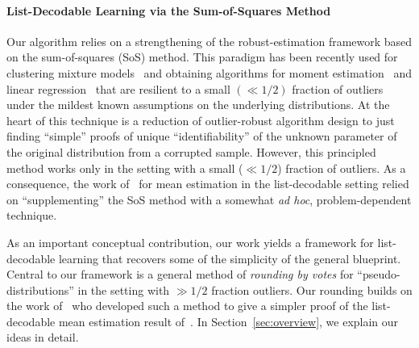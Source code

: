 


\paragraph{List-Decodable Learning via the Sum-of-Squares Method} Our algorithm relies on a strengthening of the robust-estimation framework based on the sum-of-squares (SoS) method. This paradigm has been recently used for clustering mixture models~\cite{HopkinsLi17,KothariSteinhardt17} and obtaining algorithms for moment estimation~\cite{2017KS} and linear regression~\cite{DBLP:conf/colt/KlivansKM18} that are resilient to a small $(\ll 1/2)$ fraction of outliers under the mildest known assumptions on the underlying distributions. At the heart of this technique is a reduction of outlier-robust algorithm design to just finding ``simple'' proofs of  unique ``identifiability'' of the unknown parameter of the original distribution from a corrupted sample. However, this principled method works only in the setting with a small ($\ll 1/2$) fraction of outliers. As a consequence, the work of~\cite{KothariSteinhardt17} for mean estimation in the list-decodable setting relied on ``supplementing'' the SoS method with a somewhat \emph{ad hoc}, problem-dependent technique. 

As an important conceptual contribution, our work yields a framework for list-decodable learning that recovers some of the simplicity of the general blueprint. Central to our framework is a general method of \emph{rounding by votes} for ``pseudo-distributions''  in the setting with $\gg 1/2$ fraction outliers. Our rounding builds on the work of~\cite{KS19} who developed such a method to give a simpler proof of the list-decodable mean estimation result of~\cite{KothariSteinhardt17}. In Section~\ref{sec:overview}, we explain our ideas in detail. 

